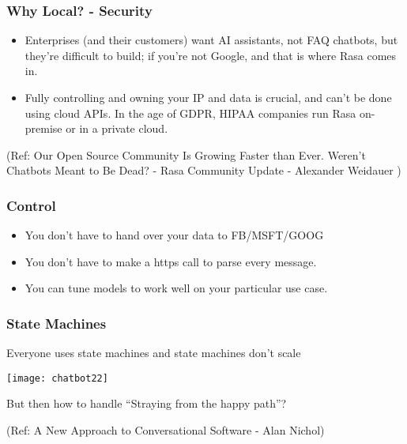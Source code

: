  \begin{frame}[fragile]\frametitle{Why Local? - Security}
\begin{itemize}
\item Enterprises (and their customers) want AI assistants, not FAQ chatbots, but they’re difficult to build; if you’re not Google, and that is where Rasa comes in.
\item Fully controlling and owning your IP and data is crucial, and can’t be done using cloud APIs. In the age of GDPR, HIPAA companies run Rasa on-premise or in a private cloud.
\end{itemize}

{\tiny (Ref: Our Open Source Community Is Growing Faster than Ever. Weren't Chatbots Meant to Be Dead? - Rasa Community Update - Alexander Weidauer )}
\end{frame}

 \begin{frame}[fragile]\frametitle{Control}
\begin{itemize}
\item You don't have to hand over your data to FB/MSFT/GOOG
\item You don't have to make a https call to parse every message.
\item You can tune models to work well on your particular use case.
\end{itemize}
\end{frame}


 \begin{frame}[fragile]\frametitle{State Machines}
Everyone uses state machines and state machines don’t scale


\begin{center}
\texttt{[image: chatbot22]}

\end{center}

But then how to handle “Straying from the happy path”?

{\tiny (Ref: A New Approach to Conversational Software - Alan Nichol)}
\end{frame}


